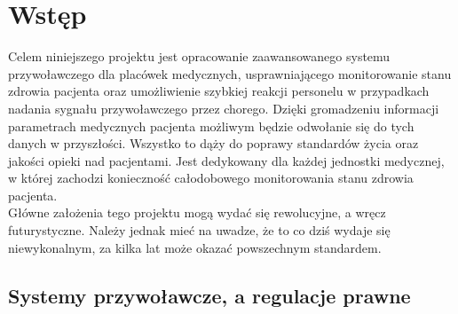 \documentclass[12pt]{article} %
\begin{document}

\tableofcontents %

\newpage %


\section{Wstęp} %

Celem niniejszego projektu jest opracowanie zaawansowanego systemu przywoławczego dla placówek medycznych, usprawniającego monitorowanie stanu zdrowia pacjenta oraz umożliwienie szybkiej reakcji personelu w przypadkach nadania sygnału przywoławczego przez chorego. Dzięki gromadzeniu informacji parametrach medycznych pacjenta możliwym będzie odwołanie się do tych danych w przyszłości. Wszystko to dąży do poprawy standardów życia oraz jakości opieki nad pacjentami. Jest dedykowany dla każdej jednostki medycznej, w której zachodzi konieczność całodobowego monitorowania stanu zdrowia pacjenta. \\
Główne założenia tego projektu mogą wydać się rewolucyjne, a wręcz futurystyczne. Należy jednak mieć na uwadze, że to co dziś wydaje się niewykonalnym, za kilka lat może okazać powszechnym standardem.

\subsection{Systemy przywoławcze, a regulacje prawne} %
\end{document}
